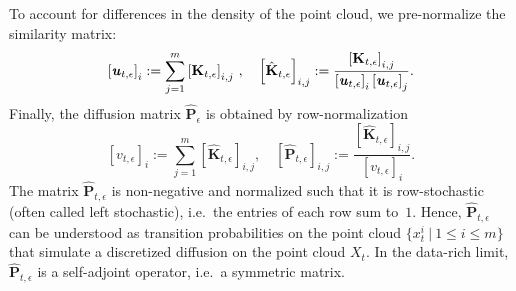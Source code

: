 To account for differences in the density of the point cloud, we pre-normalize the similarity matrix:
\begin{equation}
    \left[\textbf{\textit{u}}_{t,\epsilon}\right]_{i} := \sum_{j=1}^m \left[\mathbf{K}_{t,\epsilon}\right]_{i,j} \, , \quad \left[\hat{\mathbf{K}}_{t,\epsilon}\right]_{i,j} := \frac{\left[\mathbf{K}_{t,\epsilon}\right]_{i,j}}{\left[\textbf{\textit{u}}_{t,\epsilon}\right]_{i}\left[\textbf{\textit{u}}_{t,\epsilon}\right]_{j}}.
\end{equation}
Finally, the diffusion matrix $\hat{\mathbf{P}}_{\epsilon}$ is obtained by row-normalization
\begin{equation}\label{eqn:P}
    \left[v_{t, \epsilon}\right]_{i} := \sum_{j=1}^m \left[\hat{\mathbf{K}}_{t, \epsilon}\right]_{i,j}, \quad \left[\hat{\mathbf{P}}_{t, \epsilon}\right]_{i,j} := \frac{\left[\hat{\mathbf{K}}_{t, \epsilon}\right]_{i,j}}{\left[v_{t, \epsilon}\right]_{i}}.
\end{equation}
The matrix $\hat{\mathbf{P}}_{t, \epsilon}$ is non-negative and normalized such that it is row-stochastic (often called left stochastic), i.e.~the entries of each row sum to~$1$. Hence, $\hat{\mathbf{P}}_{t, \epsilon}$ can be understood as transition probabilities on the point cloud $\{x_t^i \: | \: 1\leq i \leq m\}$ that simulate a discretized diffusion on the point cloud $X_t$.
In the data-rich limit, $\hat{\mathbf{P}}_{t, \epsilon}$ is a self-adjoint operator, i.e.~a symmetric matrix.

